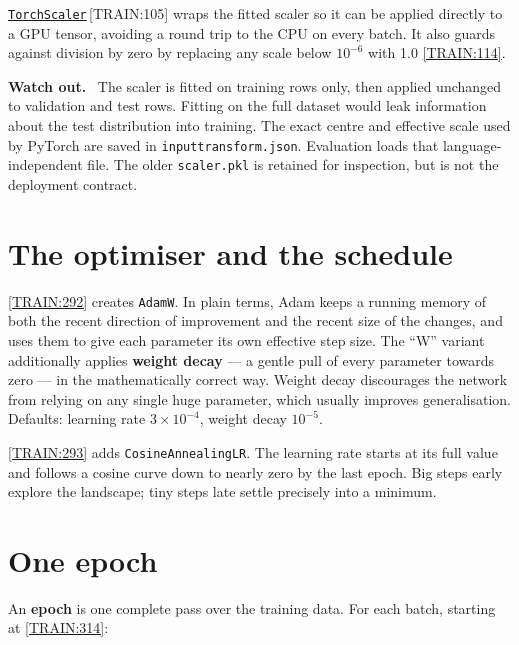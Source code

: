 \documentclass[11pt,a4paper]{report}
\newcommand{\srcbase}{vscode://file/Users/syellapa/Documents/Research/2026/ANSYS/Multi-ScalarPDF}
\newcommand{\dmdn}{dirichlet\string_mdn}
\newcommand{\srctag}[1]{{\footnotesize\textcolor{TagGray}{[#1]}}}
\newcommand{\Train}[2]{\href{\srcbase/\dmdn/train.py:#1}{\texttt{#2}}\,\srctag{TRAIN:#1}}
\newcommand{\TrainL}[1]{\href{\srcbase/\dmdn/train.py:#1}{\srctag{TRAIN:#1}}}
\newcommand{\code}[1]{\texttt{#1}}
\newcommand{\term}[1]{\textbf{#1}}
\renewcommand{\_}{\origtextunderscore\allowbreak}
\newlength{\calloutwidth}
\newcommand{\calloutOpen}{%
  \par\medskip\noindent
  \setlength{\calloutwidth}{\dimexpr\linewidth-2\fboxsep\relax}%
  \begin{lrbox}{\calloutbox}\begin{minipage}{\calloutwidth}}
\newcommand{\calloutClose}[1]{%
  \end{minipage}\end{lrbox}\colorbox{#1}{\usebox{\calloutbox}}\par\medskip}
\newenvironment{caution}
  {\calloutOpen\textbf{Watch out.}\ }
  {\calloutClose{WarnBG}}
\begin{document}
\Train{105}{TorchScaler} wraps the fitted scaler so it can be applied directly to a GPU tensor,
avoiding a round trip to the CPU on every batch. It also guards against division by zero by
replacing any scale below $10^{-6}$ with 1.0 \TrainL{114}.

\begin{caution}
The scaler is fitted on training rows only, then applied unchanged to validation and test rows.
Fitting on the full dataset would leak information about the test distribution into training.
The exact centre and effective scale used by PyTorch are saved in
\code{input\_transform.json}. Evaluation loads that language-independent file. The older
\code{scaler.pkl} is retained for inspection, but is not the deployment contract.
\end{caution}

\section{The optimiser and the schedule}

\TrainL{292} creates \code{AdamW}. In plain terms, Adam keeps a running memory of both the
recent direction of improvement and the recent size of the changes, and uses them to give each
parameter its own effective step size. The ``W'' variant additionally applies
\term{weight decay} --- a gentle pull of every parameter towards zero --- in the mathematically
correct way. Weight decay discourages the network from relying on any single huge parameter,
which usually improves generalisation. Defaults: learning rate $3 \times 10^{-4}$, weight decay
$10^{-5}$.

\TrainL{293} adds \code{CosineAnnealingLR}. The learning rate starts at its full value and
follows a cosine curve down to nearly zero by the last epoch. Big steps early explore the
landscape; tiny steps late settle precisely into a minimum.

\section{One epoch}

An \term{epoch} is one complete pass over the training data. For each batch, starting at
\TrainL{314}:
\end{document}

